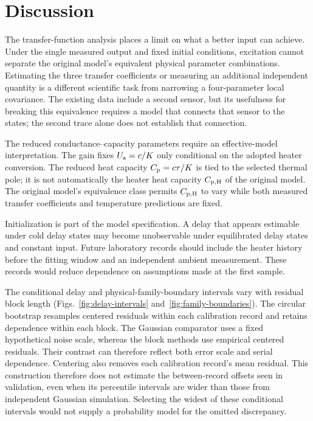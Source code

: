 \section{Discussion}
The transfer-function analysis places a limit on what a better input can achieve.
Under the single measured output and fixed initial conditions, excitation cannot
separate the original model's equivalent physical parameter combinations.
Estimating the three transfer coefficients or measuring an additional independent
quantity is a different scientific task from narrowing a four-parameter local
covariance. The existing data include a second sensor, but its usefulness for
breaking this equivalence requires a model that connects that sensor to the
states; the second trace alone does not establish that connection.

The reduced conductance--capacity parameters require an effective-model
interpretation. The gain fixes $U_{\mathrm a}=c/K$ only conditional on the adopted heater
conversion. The reduced heat capacity $C_{\mathrm p}=c\tau/K$ is tied to the selected
thermal pole; it is not automatically the heater heat capacity $C_{\mathrm{p,H}}$ of the
original model. The original model's equivalence class permits $C_{\mathrm{p,H}}$ to vary
while both measured transfer coefficients and temperature predictions are fixed.

Initialization is part of the model specification. A delay that appears estimable
under cold delay states may become unobservable under equilibrated delay states
and constant input. Future laboratory records should include the heater history
before the fitting window and an independent ambient measurement. These records
would reduce dependence on assumptions made at the first sample.

The conditional delay and physical-family-boundary intervals vary with residual
block length (Figs.~\ref{fig:delay-intervals} and~\ref{fig:family-boundaries}).
The circular bootstrap resamples centered residuals within each calibration
record and retains dependence within each block. The Gaussian comparator uses
a fixed hypothetical noise scale, whereas the block methods use empirical
centered residuals. Their contrast can therefore reflect both error scale and
serial dependence. Centering also
removes each calibration record's mean residual. This construction therefore
does not estimate the between-record offsets seen in validation, even when its
percentile intervals are wider than those from independent Gaussian simulation.
Selecting the widest of these conditional intervals would not supply a
probability model for the omitted discrepancy.

